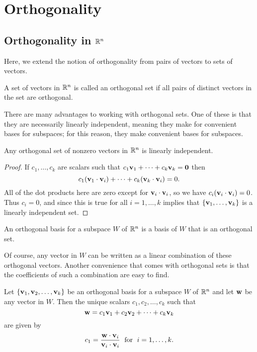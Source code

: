 \documentclass[../m073main.tex]{subfiles}
\begin{document}
\chapter{Orthogonality}
\section{Orthogonality in $\mathbb{R}^n$}
Here, we extend the notion of orthogonality from pairs of vectors to sets of vectors.

\begin{definition}
	A set of vectors in $\mathbb{R}^n$ is called an orthogonal set if all pairs of distinct vectors in the set are orthogonal. 
\end{definition}

There are many advantages to working with orthogonal sets.
One of these is that they are necessarily linearly independent, meaning they make for convenient bases for subspaces; for this reason, they make convenient bases for subspaces.

\begin{theorem}
	Any orthogonal set of nonzero vectors in $\mathbb{R}^n$ is linearly independent.
\end{theorem}

\begin{proof}
	If $c_1, \ldots, c_k$ are scalars such that $c_1 \mathbf{v}_1 + \cdots + c_k \mathbf{v}_k = \mathbf{0}$ then
	\[ c_1 (\mathbf{v}_1 \cdot \mathbf{v}_i) + \cdots + c_k (\mathbf{v}_k \cdot \mathbf{v}_i) = 0. \]
	All of the dot products here are zero except for $\mathbf{v}_i \cdot \mathbf{v}_i$, so we have $c_i (\mathbf{v}_i \cdot \mathbf{v}_i) = 0$.
	Thus $c_i = 0$, and since this is true for all $i = 1, \ldots, k$ implies that $\left\{ \mathbf{v}_1, \ldots, \mathbf{v}_k \right\}$ is a linearly independent set.
\end{proof}

\begin{definition}
	An orthogonal basis for a subspace $W$ of $\mathbb{R}^n$ is a basis of $W$ that is an orthogonal set.
\end{definition}

Of course, any vector in $W$ can be written as a linear combination of these orthogonal vectors.
Another convenience that comes with orthogonal sets is that the coefficients of such a combination are easy to find.

\begin{theorem}
	Let $\{\mathbf{v}_1, \mathbf{v}_2, \ldots, \mathbf{v}_k\}$ be an orthogonal basis for a subspace $W$ of $\mathbb{R}^n$ and let $\mathbf{w}$ be any vector in $W$.
	Then the unique scalars $c_1, c_2, \ldots, c_k$ such that
	\[ \mathbf{w} = c_1 \mathbf{v}_1 + c_2 \mathbf{v}_2 + \cdots + c_k \mathbf{v}_k \]
	are given by
	\[ c_1 = \frac{\mathbf{w} \cdot \mathbf{v}_i}{\mathbf{v}_i \cdot \mathbf{v}_i} \;\text{ for }\; i = 1, \ldots, k. \]
\end{theorem}
\end{document}
